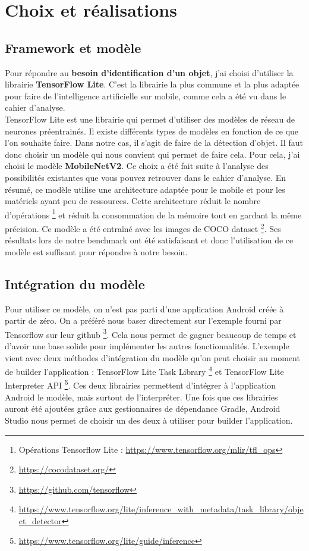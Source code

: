 \documentclass[UTF8]{EPURapport}
\begin{document}
\chapter{Choix et réalisations}

\section{Framework et modèle}

Pour répondre au \textbf{besoin d'identification d'un objet}, j'ai choisi d'utiliser la librairie \textbf{TensorFlow Lite}. C'est la librairie la plus commune et la plus adaptée pour faire de l'intelligence artificielle sur mobile, comme cela a été vu dans le cahier d'analyse.\\

TensorFlow Lite est une librairie qui permet d'utiliser des modèles de réseau de neurones préentrainés. Il existe différents types de modèles en fonction de ce que l'on souhaite faire. Dans notre cas, il s'agit de faire de la détection d'objet. Il faut donc choisir un modèle qui nous convient qui permet de faire cela. Pour cela, j'ai choisi le modèle \textbf{MobileNetV2}. Ce choix a été fait suite à l'analyse des possibilités existantes que vous pouvez retrouver dans le cahier d'analyse. En résumé, ce modèle utilise une architecture adaptée pour le mobile et pour les matériels ayant peu de ressources. Cette architecture réduit le nombre d'opérations \footnote{Opérations Tensorflow Lite : \url{https://www.tensorflow.org/mlir/tfl_ops}} et réduit la consommation de la mémoire tout en gardant la même précision. Ce modèle a été entraîné avec les images de COCO dataset \footnote{\url{https://cocodataset.org/}}. Ses résultats lors de notre benchmark ont été satisfaisant et donc l'utilisation de ce modèle est suffisant pour répondre à notre besoin.

\section{Intégration du modèle}

Pour utiliser ce modèle, on n'est pas parti d'une application Android créée à partir de zéro. On a préféré nous baser directement sur l'exemple fourni par Tensorflow sur leur github \footnote{\url{https://github.com/tensorflow}}. Cela nous permet de gagner beaucoup de temps et d'avoir une base solide pour implémenter les autres fonctionnalités. L'exemple vient avec deux méthodes d'intégration du modèle qu'on peut choisir au moment de builder l'application : TensorFlow Lite Task Library \footnote{\url{https://www.tensorflow.org/lite/inference_with_metadata/task_library/object_detector}} et TensorFlow Lite Interpreter API \footnote{\url{https://www.tensorflow.org/lite/guide/inference}}. Ces deux librairies permettent d'intégrer à l'application Android le modèle, mais surtout de l'interpréter. Une fois que ces librairies auront été ajoutées grâce aux gestionnaires de dépendance Gradle, Android Studio nous permet de choisir un des deux à utiliser pour builder l'application.\\
\end{document}
